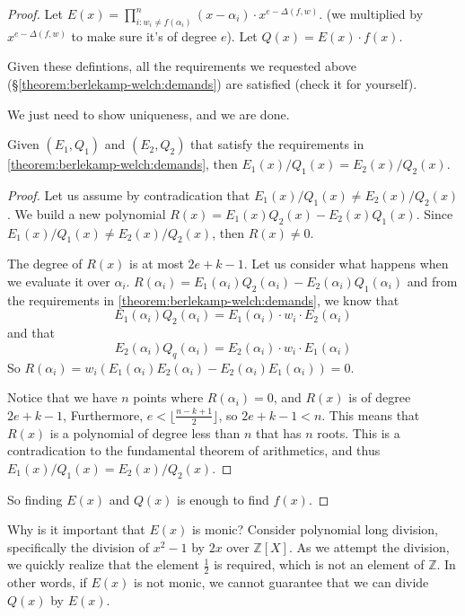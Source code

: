 \begin{proof}
    Let $E(x)=\prod_{i:w_i\ne f(\alpha_i)}^{n} (x-\alpha_i)\cdot x^{e-\Delta(f,w)}$.
    (we multiplied by $x^{e-\Delta(f,w)}$ to make sure it's of degree $e$).
    Let $Q(x)=E(x)\cdot f(x)$.
    
    Given these defintions, all the requirements we requested above 
    (\S\ref{theorem:berlekamp-welch:demands}) are satisfied (check it for yourself).

    We just need to show uniqueness, and we are done.
    \begin{lemma}
        Given $(E_1, Q_1)$ and $(E_2, Q_2)$ that satisfy the requirements in \ref{theorem:berlekamp-welch:demands},
        then $E_1(x)/Q_1(x) = E_2(x)/Q_2(x)$.
    \end{lemma}

    \begin{proof}
        Let us assume by contradication that $E_1(x)/Q_1(x) \ne E_2(x)/Q_2(x)$.
        We build a new polynomial  $R(x)=E_1(x)Q_2(x) - E_2(x)Q_1(x)$.
        Since $E_1(x)/Q_1(x) \ne E_2(x)/Q_2(x)$, then $R(x)\ne 0$.

        The degree of $R(x)$ is at most $2e+k-1$. Let us consider what happens when we 
        evaluate it over $\alpha_i$.
        $R(\alpha_i)= E_1(\alpha_i)Q_2(\alpha_i) - E_2(\alpha_i)Q_1(\alpha_i)$
        and from the requirements in \ref{theorem:berlekamp-welch:demands}, we know that
        $$E_1(\alpha_i)Q_2(\alpha_i) = E_1(\alpha_i)\cdot w_i\cdot E_2(\alpha_i)$$
        and that 
        $$E_2(\alpha_i)Q_q(\alpha_i) = E_2(\alpha_i)\cdot w_i\cdot E_1(\alpha_i)$$
        So $R(\alpha_i)= w_i(E_1(\alpha_i)E_2(\alpha_i) - E_2(\alpha_i)E_1(\alpha_i))=0$.

        Notice that we have $n$ points where $R(\alpha_i)=0$, and $R(x)$ is of degree $2e+k-1$,
        Furthermore, $e<\lfloor \frac{n-k+1}{2}\rfloor$, so $2e+k-1<n$.
        This means that $R(x)$ is a polynomial of degree less than $n$ that has $n$ roots.
        This is a contradication to the fundamental theorem of arithmetics,
        and thus $E_1(x)/Q_1(x) = E_2(x)/Q_2(x)$.
    \end{proof}

    So finding $E(x)$ and $Q(x)$ is enough to find $f(x)$.
\end{proof}


\begin{bclogo}[logo=\bcquestion]{Why is it important that $E(x)$ is monic?}
    Consider polynomial long division, specifically 
    the division of $x^2-1$ by $2x$ over $\mathbb{Z}[X]$. 
    As we attempt the division, we quickly realize that the element 
    $\frac{1}{2}$ is required, which is not an element of $\mathbb{Z}$. 
    In other words, if $E(x)$ is not monic, we cannot guarantee that we can divide $Q(x)$ by $E(x)$.
\end{bclogo}

